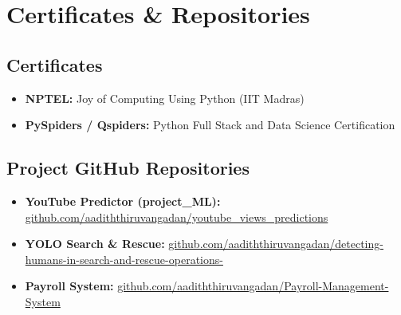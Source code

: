 \documentclass[11pt,letterpaper]{article}
\begin{document}
\vspace{0.15in}

\section{Certificates \& Repositories}
\subsection{Certificates}
\begin{itemize}
    \item \textbf{NPTEL:} Joy of Computing Using Python (IIT Madras)
    \item \textbf{PySpiders / Qspiders:} Python Full Stack and Data Science Certification
\end{itemize}

\subsection{Project GitHub Repositories}
\begin{itemize}
    \item \textbf{YouTube Predictor (project\_ML):} \href{https://github.com/aadiththiruvangadan/youtube_views_predictions}{github.com/aadiththiruvangadan/youtube\_views\_predictions}
    \item \textbf{YOLO Search \& Rescue:} \href{https://github.com/aadiththiruvangadan/detecting-humans-in-search-and-rescue-operations-}{github.com/aadiththiruvangadan/detecting-humans-in-search-and-rescue-operations-}
    \item \textbf{Payroll System:} \href{https://github.com/aadiththiruvangadan/Payroll-Management-System}{github.com/aadiththiruvangadan/Payroll-Management-System}
\end{itemize}
\end{document}
